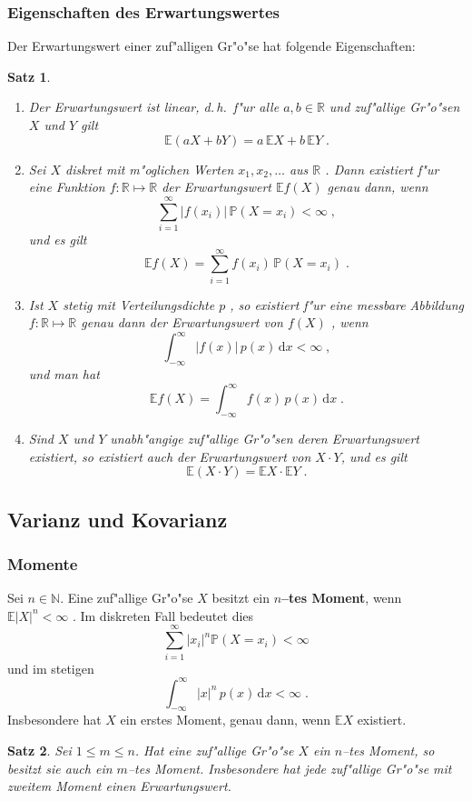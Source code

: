 \documentclass[ngerman,draft,parskip=half,twoside]{scrartcl}
\newtheorem{thm}{Satz}[section]
\newcommand*{\R}{\mathbb{R}}      %
\newcommand*{\N}{\mathbb{N}}      %
\newcommand*{\E}{\mathbb{E}}        %
\newcommand*{\WKM}{\mathbb{P}}      %
\begin{document}
\subsubsection{Eigenschaften des Erwartungswertes}
Der Erwartungswert einer zuf"alligen Gr"o"se hat folgende Eigenschaften$\colon$
\begin{thm}~
\begin{enumerate}
\item
Der Erwartungswert ist linear, d.\,h.~f"ur alle $a,b\in\R$ und zuf"allige Gr"o"sen $X$ und $Y$
gilt
$$
\E(a X+ b Y) = a\,\E X + b\, \E Y\;.
$$
\item
Sei  $X$ diskret mit m"oglichen Werten $x_1,x_2,\ldots$ aus $\R$ .
Dann existiert f"ur eine Funktion $f \colon\R\mapsto\R$
der Erwartungswert $\E f(X)$ genau dann, wenn
$$
\sum_{i=1}^\infty |f(x_i)|\,\WKM(X=x_i)<\infty\;,
$$
und es gilt
$$
\E f(X)=\sum_{i=1}^\infty f(x_i)\,\WKM(X=x_i)\;.
$$
\item
Ist $X$ stetig mit Verteilungsdichte $p$ , so existiert f"ur eine messbare
Abbildung $f \colon\R\mapsto\R$ genau dann der Erwartungswert von $f(X)$ , wenn
$$
\int_{-\infty}^\infty |f(x)|\,p(x)\,\mathrm d x<\infty\;,
$$
und man hat
$$
\E f(X)=\int_{-\infty}^\infty  f(x) \,p(x)\,\mathrm d x\;.
$$
\item
Sind $X$ und $Y$ unabh"angige zuf"allige Gr"o"sen deren Erwartungswert existiert,
so existiert auch der Erwartungswert von $X\cdot Y$, und es gilt
$$
\E(X\cdot Y)= \E X \cdot \E Y\;.
$$
\end{enumerate}
\end{thm}

\subsection{Varianz und Kovarianz}
\subsubsection{Momente}
Sei $n\in\N$. Eine zuf"allige Gr"o"se $X$ besitzt ein \textbf{$n$--tes Moment}, wenn
$\E|X|^n<\infty$ . Im diskreten Fall bedeutet dies
$$
\sum_{i=1}^\infty |x_i|^n\WKM(X=x_i)<\infty
$$
und im stetigen
$$
\int_{-\infty}^\infty |x|^n\,p(x)\,\mathrm d x<\infty\;.
$$
Insbesondere hat $X$ ein erstes Moment, genau dann, wenn $\E X$ existiert.
\begin{thm}
Sei $1\le m\le n$. Hat eine zuf"allige Gr"o"se $X$ ein $n$--tes Moment, so besitzt sie auch ein $m$--tes Moment.
Insbesondere hat jede zuf"allige Gr"o"se mit zweitem Moment einen Erwartungswert.
\end{thm}
\end{document}
